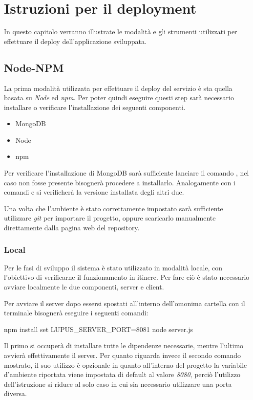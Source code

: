 \section{Istruzioni per il deployment}
In questo capitolo verranno illustrate le modalità e gli strumenti utilizzati per effettuare il deploy dell'applicazione sviluppata.

\subsection{Node-NPM}
La prima modalità utilizzata per effettuare il deploy del servizio è sta quella basata su \emph{Node} ed \emph{npm}. Per poter quindi eseguire questi step sarà necessario installare o verificare l'installazione dei seguenti componenti.
\begin{itemize}
    \item MongoDB
    \item Node
    \item npm
\end{itemize}
Per verificare l'installazione di MongoDB sarà sufficiente lanciare il comando , nel caso non fosse presente bisognerà procedere a installarlo. Analogamente con i comandi  e  si verificherà la versione installata degli altri due.

Una volta che l'ambiente è stato correttamente impostato sarà sufficiente utilizzare \emph{git} per importare il progetto, oppure scaricarlo manualmente direttamente dalla pagina web del repository.

\subsubsection{Local}
Per le fasi di sviluppo il sistema è stato utilizzato in modalità locale, con l'obiettivo di verificarne il funzionamento in itinere. Per fare ciò è stato necessario avviare localmente le due componenti, server e client.

Per avviare il server dopo essersi spostati all'interno dell'omonima cartella con il terminale bisognerà eseguire i seguenti comandi:

\begin{lcverbatim}
    npm install
    set LUPUS_SERVER_PORT=8081
    node server.js
\end{lcverbatim}

Il primo si occuperà di installare tutte le dipendenze necessarie, mentre l'ultimo avvierà effettivamente il server. Per quanto riguarda invece il secondo comando mostrato, il suo utilizzo è opzionale in quanto all'interno del progetto la variabile d'ambiente riportata viene impostata di default al valore \emph{8080}, perciò l'utilizzo dell'istruzione si riduce al solo caso in cui sia necessario utilizzare una porta diversa.

